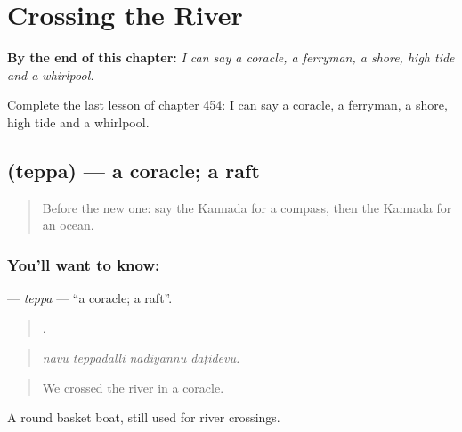 
\chapter{Crossing the River}
\label{ch:ka-crossing-the-river}

\begin{chapteropening}
\textbf{By the end of this chapter:} \emph{I can say a coracle, a ferryman, a shore, high tide and a whirlpool.}

Complete the last lesson of chapter 454: I can say a coracle, a ferryman, a shore, high tide and a whirlpool.
\end{chapteropening}

\section[\texorpdfstring{\kn{ತೆಪ್ಪ} (teppa)}{ತೆಪ್ಪ (teppa)}]{ (teppa) — a coracle; a raft}

\label{lesson:KA-C454-teppa}



\begin{quote}
Before the new one: say the Kannada for a compass, then the Kannada for an ocean.
\end{quote}

\subsection*{You'll want to know: }
\textbf{} — \emph{teppa} — \textquotedblleft{}a coracle; a raft\textquotedblright{}.

\begin{quote}
   .
\end{quote}

\begin{quote}
\emph{nāvu teppadalli nadiyannu dāṭidevu.}
\end{quote}

\begin{quote}
We crossed the river in a coracle.
\end{quote}

A round basket boat, still used for river crossings.

